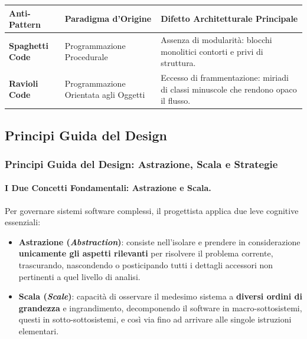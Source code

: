 \documentclass[12pt]{extarticle}
\begin{document}
\begin{center}
\small
\begin{tabular}{p{3.4cm}p{5.0cm}p{5.6cm}}
    \toprule
    \textbf{Anti-Pattern} & \textbf{Paradigma d'Origine} & \textbf{Difetto Architetturale Principale} \\
    \midrule
    \textbf{Spaghetti Code} & Programmazione Procedurale & Assenza di modularità: blocchi monolitici contorti e privi di struttura. \\
    \addlinespace
    \textbf{Ravioli Code} & Programmazione Orientata agli Oggetti & Eccesso di frammentazione: miriadi di classi minuscole che rendono opaco il flusso. \\
    \bottomrule
\end{tabular}
\end{center}

\subsection{Principi Guida del Design}
\subsubsection{Principi Guida del Design: Astrazione, Scala e Strategie}

\paragraph{I Due Concetti Fondamentali: Astrazione e Scala.}
Per governare sistemi software complessi, il progettista applica due leve cognitive essenziali:
\begin{itemize}
    \item \textbf{Astrazione (\textit{Abstraction})}: consiste nell'isolare e prendere in considerazione \textbf{unicamente gli aspetti rilevanti} per risolvere il problema corrente, trascurando, nascondendo o posticipando tutti i dettagli accessori non pertinenti a quel livello di analisi.
    \item \textbf{Scala (\textit{Scale})}: capacità di osservare il medesimo sistema a \textbf{diversi ordini di grandezza} e ingrandimento, decomponendo il software in macro-sottosistemi, questi in sotto-sottosistemi, e così via fino ad arrivare alle singole istruzioni elementari.
\end{itemize}
\end{document}
